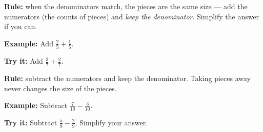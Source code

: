 \documentclass[12pt]{article}
\begin{document}


\begin{formulabox}
\textbf{Rule:} when the denominators match, the pieces are the same size ---
add the numerators (the counts of pieces) and \emph{keep the denominator}.
Simplify the answer if you can.
\end{formulabox}

\begin{examplebox}
\textbf{Example:} \quad Add $\tfrac{2}{5} + \tfrac{1}{5}$.
\end{examplebox}

\begin{tryitbox}
\textbf{Try it:} \quad Add $\tfrac{3}{7} + \tfrac{2}{7}$.\\[2pt]
\end{tryitbox}


\begin{formulabox}
\textbf{Rule:} subtract the numerators and keep the denominator.
Taking pieces away never changes the size of the pieces.
\end{formulabox}

\begin{examplebox}
\textbf{Example:} \quad Subtract $\tfrac{7}{10} - \tfrac{3}{10}$.
\end{examplebox}

\begin{tryitbox}
\textbf{Try it:} \quad Subtract $\tfrac{5}{9} - \tfrac{2}{9}$. Simplify your
answer.\\[2pt]
\end{tryitbox}

\end{document}

